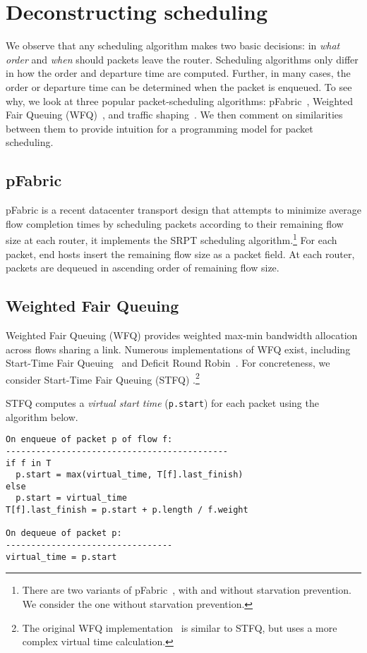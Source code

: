 \section{Deconstructing scheduling}
\label{s:deconstruct}

We observe that any scheduling algorithm makes two basic decisions: in  {\em
what order} and {\em when} should packets leave the router.  Scheduling
algorithms only differ in how the order and departure time are computed.
Further, in many cases, the order or departure time can be determined when the
packet is enqueued.  To see why, we look at three popular packet-scheduling
algorithms: pFabric~\cite{pFabric}, Weighted Fair Queuing (WFQ)~\cite{wfq}, and
traffic shaping~\cite{tbf}. We then comment on similarities between them to
provide intuition for a programming model for packet scheduling.

\subsection{pFabric}
pFabric is a recent datacenter transport design that attempts
to minimize average flow completion times by scheduling packets according to
their remaining flow size at each router, \ie it implements the SRPT scheduling
algorithm.\footnote{There are two variants of pFabric~\cite{pFabric}, with and
without starvation prevention.  We consider the one without starvation
prevention.} For each packet, end hosts insert the remaining flow size as a
packet field. At each router, packets are dequeued in ascending order of
remaining flow size.

\subsection{Weighted Fair Queuing}
\label{ss:decon_wfq}
Weighted Fair Queuing (WFQ) provides weighted
max-min bandwidth allocation across flows sharing a link. Numerous
implementations of WFQ exist, including Start-Time Fair Queuing~\cite{stfq} and
Deficit Round Robin~\cite{drr}. For concreteness, we consider Start-Time Fair
Queuing (STFQ) .\footnote{The original WFQ implementation~\cite{wfq} is similar
to STFQ, but uses a more complex virtual time calculation.}

STFQ computes a {\em virtual start time} ({\tt p.start}) for each packet using
the algorithm below. 
\begin{lstlisting}[style=customc]
On enqueue of packet p of flow f:
--------------------------------------------
if f in T
  p.start = max(virtual_time, T[f].last_finish)
else
  p.start = virtual_time
T[f].last_finish = p.start + p.length / f.weight

On dequeue of packet p:
---------------------------------
virtual_time = p.start
\end{lstlisting}

